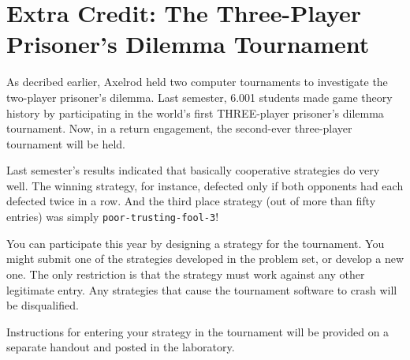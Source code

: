 \section{Extra Credit: The Three-Player Prisoner's Dilemma Tournament}

As decribed earlier, Axelrod held two computer tournaments to
investigate the two-player prisoner's dilemma. Last semester, 6.001
students made game theory history by participating in the world's
first THREE-player prisoner's dilemma tournament. Now, in a return
engagement, the second-ever three-player tournament will be held.

Last semester's results indicated that basically cooperative
strategies do very well. The winning strategy, for instance,
defected only if both opponents had each defected twice in a row. And
the third place strategy (out of more than fifty entries) was simply
{\tt poor-trusting-fool-3}!

You can participate this year by designing a strategy for the
tournament. You might submit one of the strategies developed in the
problem set, or develop a new one. The only restriction is that the
strategy must work against any other legitimate entry. Any strategies
that cause the tournament software to crash will be disqualified.

Instructions for entering your strategy in the tournament will be
provided on a separate handout and posted in the laboratory.




